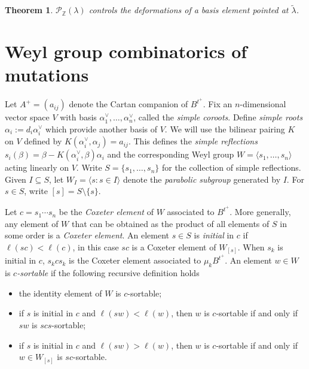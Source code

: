 \documentclass{amsart}
\newtheorem{theorem}{Theorem}
\numberwithin{theorem}{section}
\newcommand{\cP}{\mathcal{P}}
\newcommand{\ZZ}{\mathbb{Z}}
\begin{document}
  \begin{theorem}
    \cite{qin}
    $\cP_\ZZ(\lambda)$ controls the deformations of a basis element pointed at $\tilde\lambda$.
  \end{theorem}


  \section{Weyl group combinatorics of mutations}
  Let $A^+=(a_{ij})$ denote the Cartan companion of $B^{t^+}$.
  Fix an $n$-dimensional vector space $V$ with basis $\alpha^\vee_1,\ldots,\alpha^\vee_n$, called the \emph{simple coroots}.
  Define \emph{simple roots} $\alpha_i:=d_i\alpha^\vee_i$ which provide another basis of $V$.
  We will use the bilinear pairing $K$ on $V$ defined by $K(\alpha^\vee_i,\alpha_j)=a_{ij}$.
  This defines the \emph{simple reflections} $s_i(\beta)=\beta-K(\alpha^\vee_i,\beta)\alpha_i$ and the corresponding Weyl group $W=\langle s_1,\ldots,s_n\rangle$ acting linearly on $V$.
  Write $S=\{s_1,\ldots,s_n\}$ for the collection of simple reflections.
  Given $I\subseteq S$, let $W_I=\langle s:s\in I\rangle$ denote the \emph{parabolic subgroup} generated by $I$.
  For $s\in S$, write $[s]=S\setminus\{s\}$.

  Let $c=s_1\cdots s_n$ be the \emph{Coxeter element} of $W$ associated to $B^{t^+}$.
  More generally, any element of $W$ that can be obtained as the product of all elements of $S$ in some order is a \emph{Coxeter element}.
  An element $s\in S$ is \emph{initial} in $c$ if $\ell(sc)<\ell(c)$, in this case $sc$ is a Coxeter element of $W_{[s]}$.
  When $s_k$ is initial in $c$, $s_k c s_k$ is the Coxeter element associated to $\mu_k B^{t^+}$.
  An element $w\in W$ is \emph{$c$-sortable} if the following recursive definition holds
  \begin{itemize}
    \item the identity element of $W$ is $c$-sortable;
    \item if $s$ is initial in $c$ and $\ell(sw)<\ell(w)$, then $w$ is $c$-sortable if and only if $sw$ is $scs$-sortable;
    \item if $s$ is initial in $c$ and $\ell(sw)>\ell(w)$, then $w$ is $c$-sortable if and only if $w\in W_{[s]}$ is $sc$-sortable.
  \end{itemize}


  
  
\end{document}

